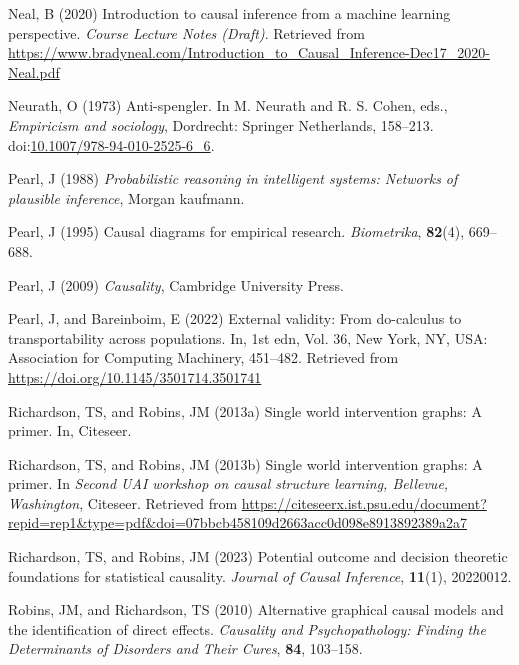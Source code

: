 \documentclass[
  single column]{article}
\newlength{\cslhangindent}
\newenvironment{CSLReferences}[2] %
 {\begin{list}{}{%
  \setlength{\itemindent}{0pt}
  \setlength{\leftmargin}{0pt}
  \setlength{\parsep}{0pt}
  \ifodd #1
   \setlength{\leftmargin}{\cslhangindent}
   \setlength{\itemindent}{-1\cslhangindent}
  \fi
  \setlength{\itemsep}{#2\baselineskip}}}
 {\end{list}}
\begin{document}
\begin{CSLReferences}{1}{0}
Neal, B (2020) Introduction to causal inference from a machine learning
perspective. \emph{Course Lecture Notes (Draft)}. Retrieved from
\url{https://www.bradyneal.com/Introduction_to_Causal_Inference-Dec17_2020-Neal.pdf}

Neurath, O (1973) Anti-spengler. In M. Neurath and R. S. Cohen, eds.,
\emph{Empiricism and sociology}, Dordrecht: Springer Netherlands,
158--213.
doi:\href{https://doi.org/10.1007/978-94-010-2525-6_6}{10.1007/978-94-010-2525-6\_6}.

Pearl, J (1988) \emph{Probabilistic reasoning in intelligent systems:
Networks of plausible inference}, Morgan kaufmann.

Pearl, J (1995) Causal diagrams for empirical research.
\emph{Biometrika}, \textbf{82}(4), 669--688.

Pearl, J (2009) \emph{Causality}, Cambridge University Press.

Pearl, J, and Bareinboim, E (2022) External validity: From do-calculus
to transportability across populations. In, 1st edn, Vol. 36, New York,
NY, USA: Association for Computing Machinery, 451--482. Retrieved from
\url{https://doi.org/10.1145/3501714.3501741}

Richardson, TS, and Robins, JM (2013a) Single world intervention graphs:
A primer. In, Citeseer.

Richardson, TS, and Robins, JM (2013b) Single world intervention graphs:
A primer. In \emph{Second UAI workshop on causal structure learning,
{B}ellevue, {W}ashington}, Citeseer. Retrieved from
\url{https://citeseerx.ist.psu.edu/document?repid=rep1&type=pdf&doi=07bbcb458109d2663acc0d098e8913892389a2a7}

Richardson, TS, and Robins, JM (2023) Potential outcome and decision
theoretic foundations for statistical causality. \emph{Journal of Causal
Inference}, \textbf{11}(1), 20220012.

Robins, JM, and Richardson, TS (2010) Alternative graphical causal
models and the identification of direct effects. \emph{Causality and
Psychopathology: Finding the Determinants of Disorders and Their Cures},
\textbf{84}, 103--158.


\end{CSLReferences}
\end{document}
